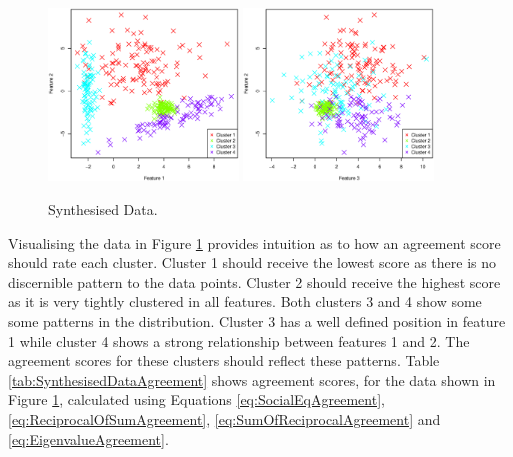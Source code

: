 			\begin{figure}[h!]
				\centering
				\subfloat
				{
					\includegraphics[width=0.45\textwidth]{chapter4/Images/ArtificialData1-2.eps}
					\label{fig:EqualiserDifferencePCA}
				}
				\qquad
				\subfloat
				{
					\includegraphics[width=0.45\textwidth]{chapter4/Images/ArtificialData3-2.eps}
					\label{fig:EqualiserDifferenceCentroidsPCA}
				}
				\caption{Synthesised Data.}
				\label{fig:SynthesisedData}
			\end{figure}

			Visualising the data in Figure \ref{fig:SynthesisedData} provides intuition as to how an agreement
			score should rate each cluster. Cluster 1 should receive the lowest score as there is no
			discernible pattern to the data points. Cluster 2 should receive the highest score as it is very
			tightly clustered in all features. Both clusters 3 and 4 show some some patterns in the
			distribution. Cluster 3 has a well defined position in feature 1 while cluster 4 shows a strong
			relationship between features 1 and 2. The agreement scores for these clusters should reflect these
			patterns. Table \ref{tab:SynthesisedDataAgreement} shows agreement scores, for the data shown in
			Figure \ref{fig:SynthesisedData}, calculated using Equations \ref{eq:SocialEqAgreement},
			\ref{eq:ReciprocalOfSumAgreement}, \ref{eq:SumOfReciprocalAgreement} and
			\ref{eq:EigenvalueAgreement}.

